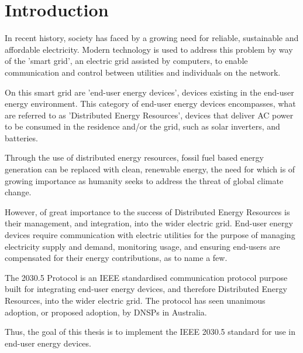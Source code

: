 \chapter{Introduction}\label{ch:intro}
In recent history, society has faced by a growing need for reliable, sustainable and affordable electricity.
Modern technology is used to address this problem by way of the 'smart grid', an electric grid assisted by computers, to enable communication and control between utilities and individuals on the network.

On this smart grid are 'end-user energy devices', devices existing in the end-user energy environment.
This category of end-user energy devices encompasses, what are referred to as 'Distributed Energy Resources',
devices that deliver AC power to be consumed in the residence and/or the grid, such as solar inverters, and batteries. \cite{IEEE2030.5}

Through the use of distributed energy resources, fossil fuel based energy generation can be replaced with clean, 
renewable energy, the need for which is of growing importance as humanity seeks to address the threat of global climate change.

However, of great importance to the success of Distributed Energy Resources is their management, and integration, into the wider electric grid.
End-user energy devices require communication with electric utilities for the purpose of managing electricity supply and demand, monitoring usage, 
and ensuring end-users are compensated for their energy contributions, as to name a few.

The 2030.5 Protocol is an IEEE standardised communication protocol purpose built for integrating end-user energy devices, and therefore Distributed Energy Resources, into the wider electric grid.
The protocol has seen unanimous adoption, or proposed adoption, by DNSPs in Australia.\cite{DOEAdoption}

Thus, the goal of this thesis is to implement the IEEE 2030.5 standard for use in end-user energy devices.


